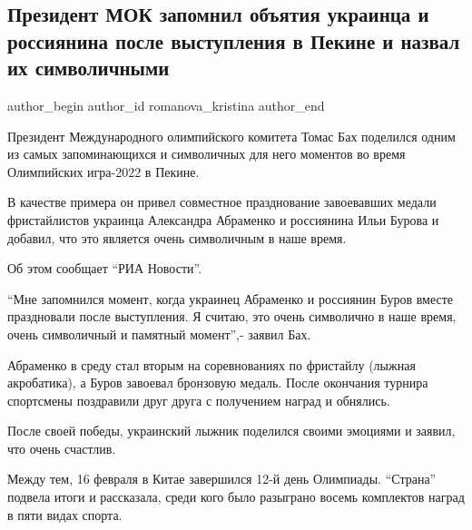  
 
 
 
 
 
\subsection{Президент МОК запомнил объятия украинца и россиянина после выступления в Пекине и назвал их символичными}
\label{sec:18_02_2022.stz.news.ua.strana.3.prezident_mok_objatia_ukrainec_rossianin}
 
\ifcmt
 author_begin
   author_id romanova_kristina
 author_end
\fi

Президент Международного олимпийского комитета Томас Бах поделился одним из
самых запоминающихся и символичных для него моментов во время Олимпийских
игра-2022 в Пекине.


В качестве примера он привел совместное празднование завоевавших медали
фристайлистов украинца Александра Абраменко и россиянина Ильи Бурова и добавил,
что это является очень символичным в наше время. 

Об этом сообщает \enquote{РИА Новости}. 

\enquote{Мне запомнился момент, когда украинец Абраменко и россиянин Буров вместе
праздновали после выступления. Я считаю, это очень символично в наше время,
очень символичный и памятный момент},- заявил Бах.

Абраменко в среду стал вторым на соревнованиях по фристайлу (лыжная
акробатика), а Буров завоевал бронзовую медаль. После окончания турнира
спортсмены поздравили друг друга с получением наград и обнялись.

После своей победы, украинский лыжник поделился своими эмоциями и заявил, что
очень счастлив. 

Между тем, 16 февраля в Китае завершился 12-й день Олимпиады. \enquote{Страна} подвела
итоги и рассказала, среди кого было разыграно восемь комплектов наград в пяти
видах спорта.
